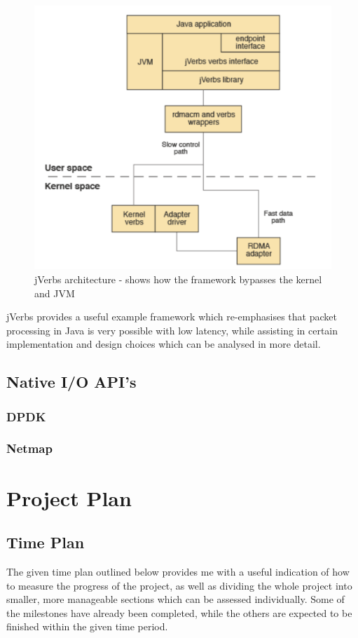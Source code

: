 \documentclass[a4paper, titlepage]{article}
\begin{document}
\begin{figure}[H]
	\centering
	\includegraphics[width=\textwidth]{images/jverbs.png}
	\caption{jVerbs architecture - shows how the framework bypasses the kernel and JVM}
	\label{fig:jverb}
\end{figure}

jVerbs provides a useful example framework which re-emphasises that packet processing in Java is very possible with low latency, while assisting in certain implementation and design choices which can be analysed in more detail. 

\subsection{Native I/O API's}
\subsubsection{DPDK}
\subsubsection{Netmap}

\newpage

\section{Project Plan}
\subsection{Time Plan}
The given time plan outlined below provides me with a useful indication of how to measure the progress of the project, as well as dividing the whole project into smaller, more manageable sections which can be assessed individually. Some of the milestones have already been completed, while the others are expected to be finished within the given time period.
\end{document}
